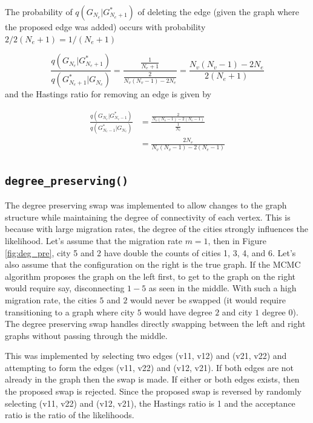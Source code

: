 \documentclass[11pt,a4paper]{article}
\numberwithin{equation}{section}
\begin{document}
The probability of \(q(G_{N_e}|G^*_{N_e+1})\) of deleting the edge
(given the graph where the proposed edge was added) occurs with
probability \(2/2(N_e+1) = 1/(N_e+1)\)

\[\frac{q(G_{N_e}|G^*_{N_e+1})}{q(G^*_{N_e+1}|G_{N_e})} = \frac{\frac{1}{N_e+1}}{\frac{2}{N_v(N_v-1) - 2N_e}} = \frac{N_v(N_v-1) - 2N_e}{2(N_e+1)} \]
and the Hastings ratio for removing an edge is given by

\[ \begin{aligned} \frac{q(G_{N_e}|G^*_{N_e-1})}{q(G^*_{N_e-1}|G_{N_e})} & = \frac{\frac{2}{N_v(N_v-1) - 2(N_e-1)}}{\frac{1}{N_e}} \\ &= \frac{2N_e}{N_v(N_v-1) - 2(N_e-1)} \end{aligned} \]

\hypertarget{degree_preserving}{%
\subsection{\texorpdfstring{\texttt{degree\_preserving()}}{degree\_preserving()}}\label{degree_preserving}}

The degree preserving swap was implemented to allow changes to the graph
structure while maintaining the degree of connectivity of each vertex.
This is because with large migration rates, the degree of the cities
strongly influences the likelihood. Let's assume that the migration rate
\(m = 1\), then in Figure \ref{fig:deg_pre}, city 5 and 2 have double
the counts of cities 1, 3, 4, and 6. Let's also assume that the
configuration on the right is the true graph. If the MCMC algorithm
proposes the graph on the left first, to get to the graph on the right
would require say, disconnecting \(1-5\) as seen in the middle. With
such a high migration rate, the cities \(5\) and \(2\) would never be
swapped (it would require transitioning to a graph where city \(5\)
would have degree \(2\) and city \(1\) degree 0). The degree preserving
swap handles directly swapping between the left and right graphs without
passing through the middle.

This was implemented by selecting two edges (v11, v12) and (v21, v22)
and attempting to form the edges (v11, v22) and (v12, v21). If both
edges are not already in the graph then the swap is made. If either or
both edges exists, then the proposed swap is rejected. Since the
proposed swap is reversed by randomly selecting (v11, v22) and (v12,
v21), the Hastings ratio is 1 and the acceptance ratio is the ratio of
the likelihoods.
\end{document}
